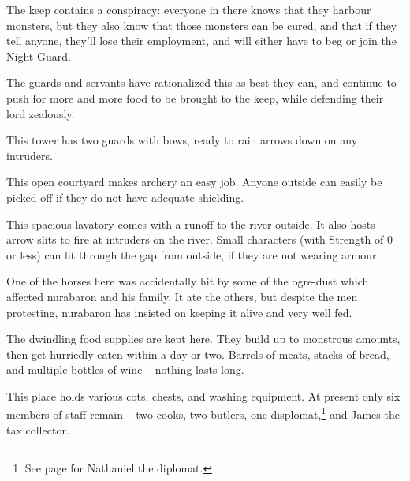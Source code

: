 \begin{multicols}{2}

\setcounter{list}{0}

The keep contains a conspiracy: everyone in there knows that they harbour monsters, but they also know that those monsters can be cured, and that if they tell anyone, they'll lose their employment, and will either have to beg or join the Night Guard.

The guards and servants have rationalized this as best they can, and continue to push for more and more food to be brought to the keep, while defending their lord zealously.


This tower has two guards with bows, ready to rain arrows down on any intruders.


\humanarcher


This open courtyard makes archery an easy job.  Anyone outside can easily be picked off if they do not have adequate shielding.


This spacious lavatory comes with a runoff to the river outside.
It also hosts arrow slits to fire at intruders on the river.
Small characters (with Strength of 0 or less) can fit through the gap from outside, if they are not wearing armour.


One of the horses here was accidentally hit by some of the ogre-dust which affected \gls{nurabaron} and his family.  It ate the others, but despite the men protesting, \gls{nurabaron} has insisted on keeping it alive and very well fed.


\nurahorse


The dwindling food supplies are kept here.  They build up to monstrous amounts, then get hurriedly eaten within a day or two.  Barrels of meats, stacks of bread, and multiple bottles of wine -- nothing lasts long.


This place holds various cots, chests, and washing equipment.  At present only six members of staff remain -- two cooks, two butlers, one displomat,\footnote{See page \pageref{nathaniel} for Nathaniel the diplomat.} and James the tax collector.


\end{multicols}
